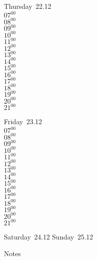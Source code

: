 \documentclass[11pt,a4paper]{book}\usepackage[]{graphicx}\usepackage[]{color}
\begin{document}
\clearpage
\begin{headerbox}
\end{headerbox}
\begin{weekdaybox}
  Thursday~22.12\\
  { 
  \vfill
  $07^{00}$\\
$08^{00}$\\
$09^{00}$\\
$10^{00}$\\
$11^{00}$\\
$12^{00}$\\
$13^{00}$\\
$14^{00}$\\
$15^{00}$\\
$16^{00}$\\
$17^{00}$\\
$18^{00}$\\
$19^{00}$\\
$20^{00}$\\
$21^{00}$\\
  }
\end{weekdaybox} 
\begin{weekdaybox}
  Friday~23.12\\
  { 
  \vfill
  $07^{00}$\\
$08^{00}$\\
$09^{00}$\\
$10^{00}$\\
$11^{00}$\\
$12^{00}$\\
$13^{00}$\\
$14^{00}$\\
$15^{00}$\\
$16^{00}$\\
$17^{00}$\\
$18^{00}$\\
$19^{00}$\\
$20^{00}$\\
$21^{00}$\\
  }
\end{weekdaybox}
\begin{weekendbox}
  Saturday~24.12
  \tcblower
  Sunday~25.12
\end{weekendbox} %
\begin{notebox}
  Notes
\end{notebox}
\clearpage
\end{document}
